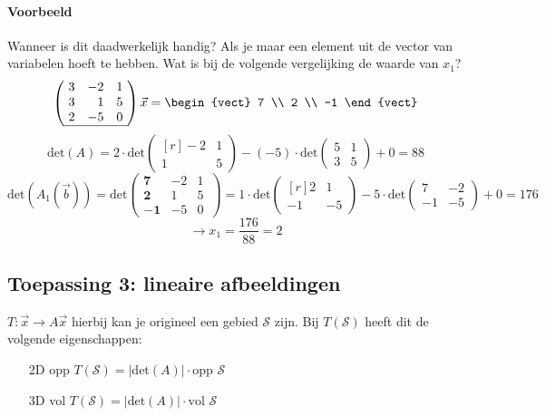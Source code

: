 \paragraph{Voorbeeld} Wanneer is dit daadwerkelijk handig? Als je maar een element uit de vector van variabelen hoeft te hebben. Wat is bij de volgende vergelijking de waarde van $x_1$?
\[ \left(\!\begin{array}{rrr}
	3 & -2 & 1 \\
	3 & 1 & 5 \\
	2 & -5 & 0 \\ \hline
\end{array}\!\right) \vec{x} = \begin{vect} 7 \\ 2 \\ -1  \end{vect} \]
\[ \mbox{det}(A) = 2 \cdot \mbox{det}\begin{pmatrix*}[r] -2 & 1 \\ 1 & 5 \end{pmatrix*} - (-5) \cdot \mbox{det}\begin{pmatrix} 5 & 1 \\ 3 & 5 \end{pmatrix} + 0 = 88 \]
\[ \mbox{det}(A_1(\vec{b})) = \mbox{det} \left(\!\begin{array}{rrr|}
	\mathbf{7} & -2 & 1 \\
	\mathbf{2} & 1 & 5 \\
	\mathbf{-1} & -5 & 0 
\end{array}\,\right) = 1 \cdot \mbox{det}\begin{pmatrix*}[r] 2 & 1 \\ -1 & -5 \end{pmatrix*} - 5 \cdot \mbox{det}\begin{pmatrix*} 7 & -2 \\ -1 & -5 \end{pmatrix*} + 0 = 176 \]
\[ \to x_1 = \frac{176}{88} = 2 \]

\subsection{Toepassing 3: lineaire afbeeldingen}
$T: \vec{x} \to A \vec{x}$ hierbij kan je origineel een gebied $\mathcal{S}$ zijn. Bij $T(\mathcal{S})$ heeft dit de volgende eigenschappen:
\begin{enumerate}
	\item[2D] opp $T(\mathcal{S}) = | \mbox{det}(A)| \cdot \mbox{opp } \mathcal{S}$
	\item[3D] vol $T(\mathcal{S}) = | \mbox{det}(A)| \cdot \mbox{vol } \mathcal{S}$
\end{enumerate}

